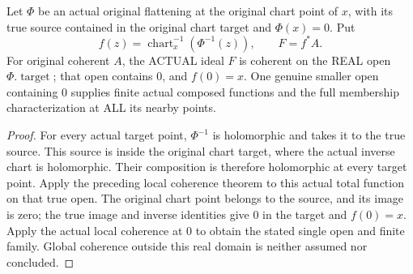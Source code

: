\begin{theorem}
\label{hir:real-centre-domain-actual-flattened-coherent-family}
\leanok
Let $\Phi$ be an actual original flattening at the original chart point
of $x$, with its true source contained in the original chart target and
$\Phi(x)=0$. Put
\[
 f(z)=\operatorname{chart}_x^{-1}(\Phi^{-1}(z)),\qquad
 F=f^*A.
\]
For original coherent $A$, the ACTUAL ideal $F$ is coherent on the REAL
open $\Phi.\operatorname{target}$; that open contains $0$, and $f(0)=x$.
One genuine smaller open containing $0$ supplies finite actual composed functions
and the full membership characterization at ALL its nearby points.
\end{theorem}
\begin{proof}
For every actual target point, $\Phi^{-1}$ is holomorphic and takes it
to the true source. This source is inside the original chart target,
where the actual inverse chart is holomorphic. Their composition is
therefore holomorphic at every target point. Apply the preceding local
coherence theorem to this actual total function on that true open.
The original chart point belongs to the source, and its image is zero;
the true image and inverse identities give $0$ in the target and
$f(0)=x$. Apply the actual local coherence at $0$ to obtain the stated
single open and finite family. Global coherence outside this real
domain is neither assumed nor concluded.
\end{proof}

